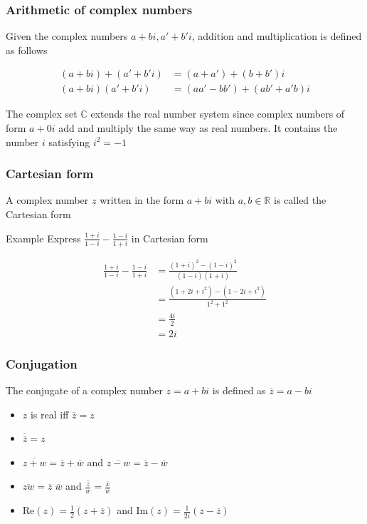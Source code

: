 \documentclass{report}
\begin{document}
		\subsubsection{Arithmetic of complex numbers}
			
			Given the complex numbers $a+bi, a'+b'i$, addition and multiplication is defined as follows

				\begin{align*}
					(a+bi)+(a'+b'i) &= (a+a') + (b+b')i	\\
					(a+bi)(a'+b'i) &= (aa'-bb') + (ab' + a'b)i
				\end{align*}

	The complex set $\mathbb{C}$ extends the real number system since complex numbers of form $a + 0i$ add and multiply the same way as real numbers. It contains the number $i$ satisfying $i^2 = -1$

		\subsubsection{Cartesian form}

			A complex number $z$ written in the form $a+bi$ with $a,b \in \mathbb{R}$ is called the Cartesian form

			\begin{question}{Example}
				Express $\frac{1+i}{1-i} - \frac{1-i}{1+i}$ in Cartesian form

				\begin{align*}
					\frac{1+i}{1-i} - \frac{1-i}{1+i} &= \frac{(1+i)^2 - (1-i)^2}{(1-i)(1+i)}	\\
													  &= \frac{(1+2i+i^2) - (1-2i+i^2)}{1^2 + 1^2}		\\
													  &= \frac{4i}{2}	\\
													  &= 2i
				\end{align*}
			\end{question}

		\subsubsection{Conjugation}

			The conjugate of a complex number $z=a+bi$ is defined as $\overline{z} = a-bi$

			\begin{itemize}
				\item $z$ is real iff $\overline{z} = z$
				\item $\overline{\overline{z}} = z$
				\item $\overline{z+w} = \overline{z} + \overline{w}$ and $\overline{z-w} = \overline{z} - \overline{w}$
				\item $\overline{zw} = \overline{z} \; \overline{w}$ and $\overline{\frac{z}{w}} = \frac{\overline{x}}{\overline{w}}$
				\item $\text{Re}(z) = \frac{1}{2}\left(z + \overline{z}\right)$ and $\text{Im}(z) = \frac{1}{2i} \left(z - \overline{z}\right)$
			\end{itemize}
\end{document}
